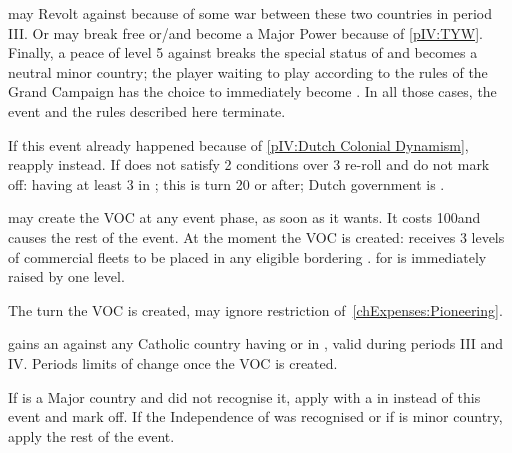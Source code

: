 \effetlong
\aparag \paysHollande may Revolt against \SPA because of some war between
these two countries in period III.
\aparag Or \paysHollande may break free or/and become a Major Power because of
\ref{pIV:TYW}.
\aparag Finally, a peace of level 5 against \SPA breaks the special status of
\VASSAL and \paysHollande becomes a neutral minor country; the player waiting
to play \HOL according to the rules of the Grand Campaign has the choice to
immediately become \HOL.
\aparag In all those cases, the event and the rules described here terminate.





\condition{}
\aparag If this event already happened because of \ref{pIV:Dutch Colonial
  Dynamism}, reapply  instead.
\aparag If \HOL does not satisfy 2 conditions over 3 re-roll and do not mark
off: having at least 3 \TP in ; this is turn 20 or after;
Dutch government is .

\phevnt
\aparag \HOL may create the VOC at any event phase, as soon as it wants. It
costs 100\ducats and causes the rest of the event.
\aparag At the moment the VOC is created:
\bparag \HOL receives 3 levels of commercial fleets to be placed in any
eligible \STZ bordering .
\bparag \FTI for \HOL is immediately raised by one level.


\phadm
\aparag The turn the VOC is created, \HOL may ignore restriction
of~\ref{chExpenses:Pioneering}.

\effetlong
\aparag \HOL gains an \OCB against any Catholic country having \TP or \COL in
, valid during periods III and IV.
\aparag Periods limits of \HOL change once the VOC is created. 




\condition{}
\aparag If \HOL is a Major country and \SPA did not recognise it, apply \RD
with a \REVOLT in \SPA instead of this event and mark off.
\aparag If the Independence of \HOL was recognised or if \paysHollande is
minor country, apply the rest of the event.

